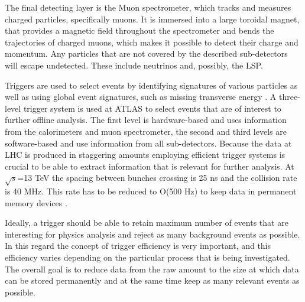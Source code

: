 The final detecting layer is the Muon spectrometer, which tracks and measures charged particles, specifically muons. It is immersed into a large toroidal magnet, that provides a magnetic field throughout the spectrometer and bends the trajectories of charged muons, which makes it possible to detect their charge and momentum. Any particles that are not covered by the described sub-detectors will escape undetected. These include neutrinos and, possibly, the LSP. 

Triggers are used to select events by identifying signatures of various particles as well as using global event signatures, such as missing transverse energy \citep{aad2012performance}. A three-level trigger system is used at ATLAS to select events that are of interest to further offline analysis. 
The  first  level is hardware-based and uses information from the calorimeters and muon spectrometer, the second and third levels are software-based and use information from all sub-detectors. Because the data at LHC is produced in staggering amounts employing efficient trigger systems is crucial to be able to extract information that is relevant for further analysis. At $\sqrt{s}$=13 TeV the spacing between bunches crossing is 25 ns and the collision rate is 40 MHz. This rate has to be reduced to O(500 Hz) to keep data in permanent memory devices \citep{barr2015particle}.

Ideally, a trigger should be able to retain maximum number of events that are interesting for physics analysis and reject as many background events as possible. In this regard the concept of trigger efficiency is very important, and this efficiency varies depending on the particular process that is being investigated. The overall goal is to reduce data from the raw amount to the size at which data can be stored permanently and at the same time keep as many relevant events as possible. 
